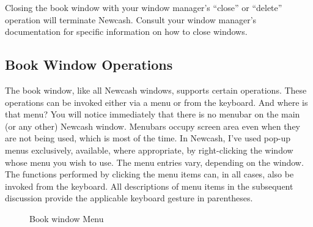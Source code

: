 \documentclass{report}
\newcommand{\graphicsfig}[5]{
\begin{figure}[#5]
\begin{center}
\resizebox{#1}{!}{\texttt{[image: \#2]}}
\end{center}
\caption{#3}
\label{#4}
\end{figure}
}
\begin{document}
Closing the book window with your window manager's ``close'' or ``delete'' operation will terminate Newcash. Consult your window manager's documentation for specific information on how to close windows.

\subsection{Book Window Operations}
\label{Book Window Operations}
The book window, like all Newcash windows, supports certain operations. These operations can be invoked either via a menu or from the keyboard. And where is that menu? You will notice immediately that there is no menubar on the main (or any other) Newcash window. Menubars occupy screen area even when they are not being used, which is most of the time. In Newcash, I've used pop-up menus exclusively, available, where appropriate, by right-clicking the window whose menu you wish to use. The menu entries vary, depending on the window. The functions performed by clicking the menu items can, in all cases, also be invoked from the keyboard. All descriptions of menu items in the subsequent discussion provide the applicable keyboard gesture in parentheses.
\graphicsfig{5in}{figures/book_window_menu.png}{Book window Menu}{Book window Menu}{}
\end{document}
